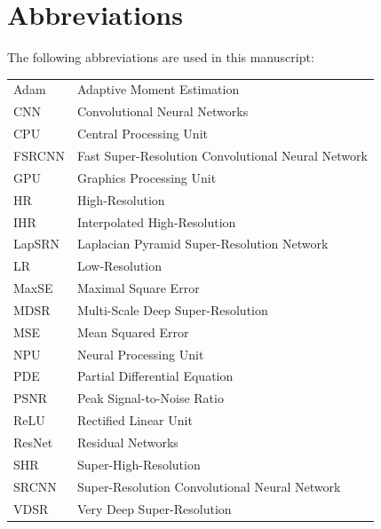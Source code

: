 \documentclass{ieeeaccess}
\begin{document}
\section{Abbreviations}
{
The following abbreviations are used in this manuscript:
\begin{table}[ht]
\setlength{\tabcolsep}{2pt}
\begin{tabular}{|p{38pt}|p{170pt}|}
\hline
Adam   & Adaptive Moment Estimation  \\
CNN    & Convolutional Neural Networks    \\ 
CPU    & Central Processing Unit \\
FSRCNN & Fast Super-Resolution Convolutional Neural Network \\
GPU    & Graphics Processing Unit \\
HR     & High-Resolution    \\ 
IHR    & Interpolated High-Resolution    \\ 
LapSRN & Laplacian Pyramid Super-Resolution Network \\
LR     & Low-Resolution     \\
MaxSE  & Maximal Square Error             \\  
MDSR   & Multi-Scale Deep Super-Resolution \\
MSE    & Mean Squared Error  \\  
NPU    & Neural Processing Unit \\
PDE    & Partial Differential Equation  \\  
PSNR   & Peak Signal-to-Noise Ratio   \\
ReLU   & Rectified Linear Unit            \\ 
ResNet & Residual Networks   \\
SHR    & Super-High-Resolution          \\ 
SRCNN  & Super-Resolution Convolutional Neural Network \\
VDSR   & Very Deep Super-Resolution\\
\hline
\end{tabular}
\end{table}

}
\end{document}
